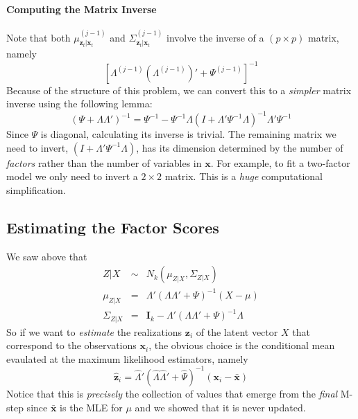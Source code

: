 \documentclass[12pt]{article}
\theoremstyle{definition}
\begin{document}
\paragraph{Computing the Matrix Inverse}
Note that both $\mu^{(j-1)}_{\mathbf{z}_t|\mathbf{x}_t}$ and $\Sigma^{(j-1)}_{\mathbf{z}_t|\mathbf{x}_t}$ involve the inverse of a $(p\times p)$ matrix, namely
	$$\left[\Lambda^{(j-1)} \left(\Lambda^{(j-1)}\right)' + \Psi^{(j-1)}\right]^{-1}$$
Because of the structure of this problem, we can convert this to a \emph{simpler} matrix inverse using the following lemma:
	$$(\Psi + \Lambda \Lambda')^{-1} = \Psi^{-1} - \Psi^{-1} \Lambda\left(I + \Lambda'\Psi^{-1}\Lambda\right)^{-1} \Lambda'\Psi^{-1}$$
Since $\Psi$ is diagonal, calculating its inverse is trivial. The remaining matrix we need to invert, $(I + \Lambda' \Psi^{-1} \Lambda)$, has its dimension determined by the number of \emph{factors} rather than the number of variables in $\mathbf{x}$. For example, to fit a two-factor model we only need to invert a $2\times 2$ matrix. This is a \emph{huge} computational simplification.

\subsection{Estimating the Factor Scores}
We saw above that
	\begin{eqnarray*}
		Z|X &\sim& N_k(\mu_{Z|X}, \Sigma_{Z|X})\\
		\mu_{Z|X} &=& \Lambda' (\Lambda \Lambda' + \Psi)^{-1}(X - \mu) \\
		\Sigma_{Z|X} &=& \mathbf{I}_k - \Lambda'(\Lambda \Lambda' + \Psi)^{-1}\Lambda
	\end{eqnarray*}
So if we want to \emph{estimate} the realizations $\mathbf{z}_i$ of the latent vector $X$ that correspond to the observations $\mathbf{x}_i$, the obvious choice is the conditional mean evaulated at the maximum likelihood estimators, namely
	$$\widehat{\textbf{z}}_i = \widehat{\Lambda}' \left(\widehat{\Lambda} \widehat{\Lambda}' + \widehat{\Psi}\right)^{-1}\left(\textbf{x}_i - \bar{\textbf{x}}\right) $$
Notice that this is \emph{precisely} the collection of values that emerge from the \emph{final} M-step since $\bar{\mathbf{x}}$ is the MLE for $\mu$ and we showed that it is never updated.
\end{document}
